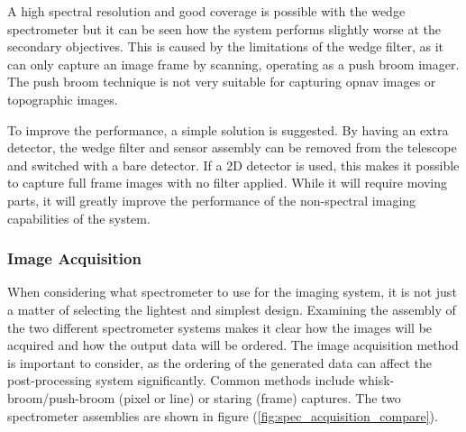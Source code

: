 A high spectral resolution and good coverage is possible with the wedge spectrometer but it can be seen how the system performs slightly worse at the secondary objectives. This is caused by the limitations of the wedge filter, as it can only capture an image frame by scanning, operating as a push broom imager. The push broom technique is not very suitable for capturing opnav images or topographic images.

To improve the performance, a simple solution is suggested. By having an extra detector, the wedge filter and sensor assembly can be removed from the telescope and switched with a bare detector. If a 2D detector is used, this makes it possible to capture full frame images with no filter applied. While it will require moving parts, it will greatly improve the performance of the non-spectral imaging capabilities of the system.
\subsubsection*{Image Acquisition}
When considering what spectrometer to use for the imaging system, it is not just a  matter of selecting the lightest and simplest design. Examining the assembly of the two different spectrometer systems makes it clear how the images will be acquired and how the output data will be ordered. The image acquisition method is important to consider, as the ordering of the generated data can affect the post-processing system significantly. Common methods include whisk-broom/push-broom (pixel or line) or staring (frame) captures. The two spectrometer assemblies are shown in figure (\ref{fig:spec_acquisition_compare}). 

